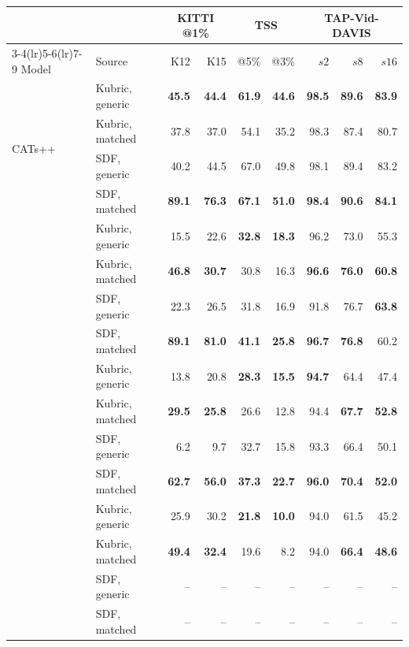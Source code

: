 \begin{tabular}{ll rr rr rrr}
\toprule
 &  & \multicolumn{2}{c}{KITTI @1\%} & \multicolumn{2}{c}{TSS} & \multicolumn{3}{c}{TAP-Vid-DAVIS} \\
\cmidrule(lr){3-4}\cmidrule(lr){5-6}\cmidrule(lr){7-9}
Model & Source & K12 & K15 & @5\% & @3\% & $s2$ & $s8$ & $s16$ \\
\midrule
\multirow{4}{*}{CATs++}
 & Kubric, generic & \textbf{45.5} & \textbf{44.4} & \textbf{61.9} & \textbf{44.6} & \textbf{98.5} & \textbf{89.6} & \textbf{83.9} \\
 & Kubric, matched & 37.8 & 37.0 & 54.1 & 35.2 & 98.3 & 87.4 & 80.7 \\
 & SDF, generic    & 40.2 & 44.5 & 67.0 & 49.8 & 98.1 & 89.4 & 83.2 \\
 & SDF, matched    & \textbf{89.1} & \textbf{76.3} & \textbf{67.1} & \textbf{51.0} & \textbf{98.4} & \textbf{90.6} & \textbf{84.1} \\
\addlinespace[3pt]
\multirow{4}{*}{GLU-Net}
 & Kubric, generic & 15.5 & 22.6 & \textbf{32.8} & \textbf{18.3} & 96.2 & 73.0 & 55.3 \\
 & Kubric, matched & \textbf{46.8} & \textbf{30.7} & 30.8 & 16.3 & \textbf{96.6} & \textbf{76.0} & \textbf{60.8} \\
 & SDF, generic    & 22.3 & 26.5 & 31.8 & 16.9 & 91.8 & 76.7 & \textbf{63.8} \\
 & SDF, matched    & \textbf{89.1} & \textbf{81.0} & \textbf{41.1} & \textbf{25.8} & \textbf{96.7} & \textbf{76.8} & 60.2 \\
\addlinespace[3pt]
\multirow{4}{*}{FlowFormer}
 & Kubric, generic & 13.8 & 20.8 & \textbf{28.3} & \textbf{15.5} & \textbf{94.7} & 64.4 & 47.4 \\
 & Kubric, matched & \textbf{29.5} & \textbf{25.8} & 26.6 & 12.8 & 94.4 & \textbf{67.7} & \textbf{52.8} \\
 & SDF, generic    &  6.2 &  9.7 & 32.7 & 15.8 & 93.3 & 66.4 & 50.1 \\
 & SDF, matched    & \textbf{62.7} & \textbf{56.0} & \textbf{37.3} & \textbf{22.7} & \textbf{96.0} & \textbf{70.4} & \textbf{52.0} \\
\addlinespace[3pt]
\multirow{4}{*}{RAFT}
 & Kubric, generic & 25.9 & 30.2 & \textbf{21.8} & \textbf{10.0} & 94.0 & 61.5 & 45.2 \\
 & Kubric, matched & \textbf{49.4} & \textbf{32.4} & 19.6 &  8.2 & 94.0 & \textbf{66.4} & \textbf{48.6} \\
 & SDF, generic    & -- & -- & -- & -- & -- & -- & -- \\
 & SDF, matched    & -- & -- & -- & -- & -- & -- & -- \\
\bottomrule
\end{tabular}
